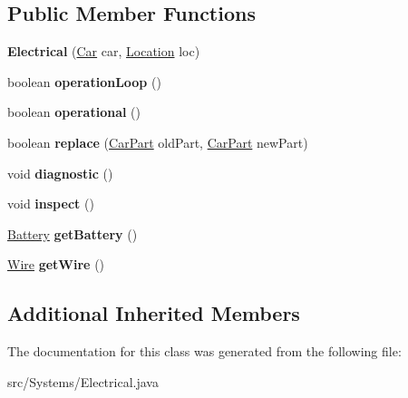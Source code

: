 \subsection*{Public Member Functions}
\begin{DoxyCompactItemize}
\item 
\hypertarget{classSystems_1_1Electrical_a8cf2687392c9cffc86c29ad9bdfe87a7}{}{\bfseries Electrical} (\hyperlink{classCars_1_1Car}{Car} car, \hyperlink{enumEnums_1_1Location}{Location} loc)\label{classSystems_1_1Electrical_a8cf2687392c9cffc86c29ad9bdfe87a7}

\item 
\hypertarget{classSystems_1_1Electrical_ab5662a428666e0a2516c5b6a790eea8f}{}boolean {\bfseries operation\+Loop} ()\label{classSystems_1_1Electrical_ab5662a428666e0a2516c5b6a790eea8f}

\item 
\hypertarget{classSystems_1_1Electrical_a5ac949e59eef886fecc63fdb0a07a765}{}boolean {\bfseries operational} ()\label{classSystems_1_1Electrical_a5ac949e59eef886fecc63fdb0a07a765}

\item 
\hypertarget{classSystems_1_1Electrical_ae50a9e1d9d3c147ffbd671ba5d392ad9}{}boolean {\bfseries replace} (\hyperlink{classCars_1_1CarPart}{Car\+Part} old\+Part, \hyperlink{classCars_1_1CarPart}{Car\+Part} new\+Part)\label{classSystems_1_1Electrical_ae50a9e1d9d3c147ffbd671ba5d392ad9}

\item 
\hypertarget{classSystems_1_1Electrical_a2e4138eb627e39556f04875eeafd93ae}{}void {\bfseries diagnostic} ()\label{classSystems_1_1Electrical_a2e4138eb627e39556f04875eeafd93ae}

\item 
\hypertarget{classSystems_1_1Electrical_a11ab42e38b1613d376b37d1976bd906f}{}void {\bfseries inspect} ()\label{classSystems_1_1Electrical_a11ab42e38b1613d376b37d1976bd906f}

\item 
\hypertarget{classSystems_1_1Electrical_a507954f14b94bfa1c3dd7df496cc4191}{}\hyperlink{classElectricalParts_1_1Battery}{Battery} {\bfseries get\+Battery} ()\label{classSystems_1_1Electrical_a507954f14b94bfa1c3dd7df496cc4191}

\item 
\hypertarget{classSystems_1_1Electrical_a1c6fa1a106c511db432925d9a9d5526a}{}\hyperlink{classConnectors_1_1Wire}{Wire} {\bfseries get\+Wire} ()\label{classSystems_1_1Electrical_a1c6fa1a106c511db432925d9a9d5526a}

\end{DoxyCompactItemize}
\subsection*{Additional Inherited Members}


The documentation for this class was generated from the following file\+:\begin{DoxyCompactItemize}
\item 
src/\+Systems/Electrical.\+java\end{DoxyCompactItemize}
